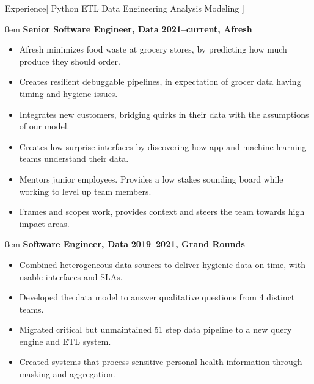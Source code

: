 \documentclass[11pt,a4paper]{article}
\newenvironment{headedsection}[2]{
    \begin{addmargin}[0.5em]{0em}
    {\large\bfseries #1} \hfill {\bfseries #2}%
    \begin{itemize}
        [label={}, topsep=0pt, itemsep=1.5pt, parsep=0pt, leftmargin=1.5em]
}{
    \end{itemize}
    \end{addmargin}
    \medskip
}
\begin{document}
\sloppy  %


\vspace{1em}

\begin{mysection}{Experience}[
    Python
    \textbullet{} ETL
    \textbullet{} Data Engineering
    \textbullet{} Analysis
    \textbullet{} Modeling
]

  \begin{headedsection}
        {Senior Software Engineer, Data}
        {2021--current, Afresh}

    \item Afresh minimizes food waste at grocery stores, by predicting how much produce they should order.
    \item Creates resilient debuggable pipelines, in expectation of grocer data having timing and hygiene issues.
    \item Integrates new customers, bridging quirks in their data with the assumptions of our model.
    \item Creates low surprise interfaces by discovering how app and machine learning teams understand their data.
    \item Mentors junior employees.  Provides a low stakes sounding board while working to level up team members.
    \item Frames and scopes work, provides context and steers the team towards high impact areas.

  \end{headedsection}

  \begin{headedsection}
        {Software Engineer, Data}
        {2019--2021, Grand Rounds}

    \item Combined heterogeneous data sources to deliver hygienic data on time,
          with usable interfaces and SLAs.
    \item Developed the data model to answer qualitative questions from 4
          distinct teams.
    \item Migrated critical but unmaintained 51 step data pipeline to a new
          query engine and ETL system.
    \item Created systems that process sensitive personal health information through masking and aggregation.


\end{headedsection}
\end{mysection}
\end{document}
